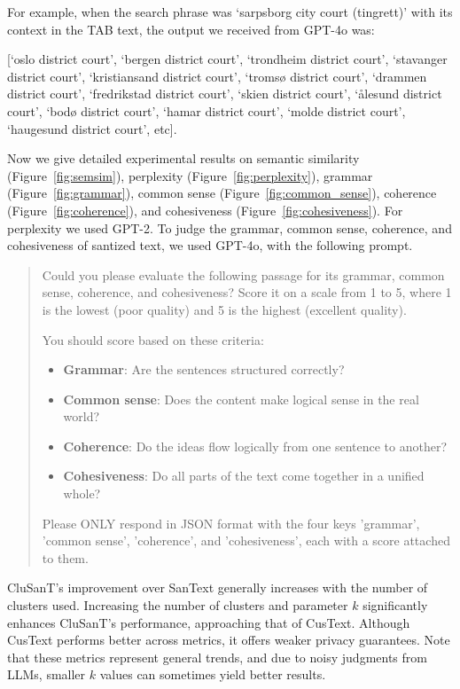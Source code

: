 For example, when the search phrase was `sarpsborg city court (tingrett)' with its context in the TAB text, the output we received from GPT-4o was:

[`oslo district court', `bergen district court', `trondheim district court', `stavanger district court', `kristiansand district court', `tromsø district court', `drammen district court', `fredrikstad district court', `skien district court', `ålesund district court', `bodø district court', `hamar district court', `molde district court', `haugesund district court', etc].


Now we give detailed experimental results on 
semantic similarity (Figure~\ref{fig:semsim}),
perplexity (Figure~\ref{fig:perplexity}),
grammar (Figure~\ref{fig:grammar}),
common sense (Figure~\ref{fig:common_sense}), 
coherence (Figure~\ref{fig:coherence}), and 
cohesiveness (Figure~\ref{fig:cohesiveness}).
For perplexity we used GPT-2. To judge the grammar, common sense, coherence, and cohesiveness of santized text, we used GPT-4o, with the following prompt. 


{\em
\begin{quote}
Could you please evaluate the following passage for its grammar, common sense, coherence, and cohesiveness? Score it on a scale from 1 to 5, where 1 is the lowest (poor quality) and 5 is the highest (excellent quality).

You should score based on these criteria:
\begin{itemize}
    \item \textbf{Grammar}: Are the sentences structured correctly?
    \item \textbf{Common sense}: Does the content make logical sense in the real world?
    \item \textbf{Coherence}: Do the ideas flow logically from one sentence to another?
    \item \textbf{Cohesiveness}: Do all parts of the text come together in a unified whole?
\end{itemize}

Please ONLY respond in JSON format with the four keys 'grammar', 'common sense', 'coherence', and 'cohesiveness', each with a score attached to them.
\end{quote}
}


CluSanT's improvement over SanText generally increases with the number of clusters used. Increasing the number of clusters and parameter \(k\) significantly enhances CluSanT’s performance, approaching that of CusText. Although CusText performs better across metrics, it offers weaker privacy guarantees. Note that these metrics represent general trends, and due to noisy judgments from LLMs, smaller \(k\) values can sometimes yield better results.



